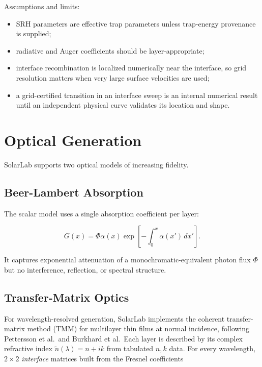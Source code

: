 \documentclass[
  11pt,
  american,
]{report}
\providecommand{\tightlist}{%
  \setlength{\itemsep}{0pt}\setlength{\parskip}{0pt}}
\begin{document}
Assumptions and limits:

\begin{itemize}
\tightlist
\item
  SRH parameters are effective trap parameters unless trap-energy
  provenance is supplied;
\item
  radiative and Auger coefficients should be layer-appropriate;
\item
  interface recombination is localized numerically near the interface,
  so grid resolution matters when very large surface velocities are
  used;
\item
  a grid-certified transition in an interface sweep is an internal
  numerical result until an independent physical curve validates its
  location and shape.
\end{itemize}

\hypertarget{optical-generation}{%
\section{Optical Generation}\label{optical-generation}}

SolarLab supports two optical models of increasing fidelity.

\hypertarget{beer-lambert-absorption}{%
\subsection{Beer-Lambert Absorption}\label{beer-lambert-absorption}}

The scalar model uses a single absorption coefficient per layer:

\begin{equation}
\label{eq:beer-lambert}
G(x)
=
\Phi \alpha(x)
\exp\left[
-\int_0^x \alpha(x')\,dx'
\right].
\end{equation}

It captures exponential attenuation of a monochromatic-equivalent photon
flux \(\Phi\) but no interference, reflection, or spectral structure.

\hypertarget{transfer-matrix-optics}{%
\subsection{Transfer-Matrix Optics}\label{transfer-matrix-optics}}

For wavelength-resolved generation, SolarLab implements the coherent
transfer-matrix method (TMM) for multilayer thin films at normal
incidence, following Pettersson et al.~and Burkhard et al.~Each layer is
described by its complex refractive index \(\tilde n(\lambda) = n + ik\)
from tabulated \(n,k\) data. For every wavelength, \(2\times2\)
\emph{interface} matrices built from the Fresnel coefficients
\end{document}
